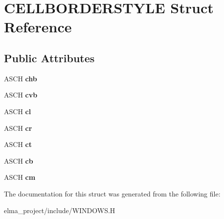\hypertarget{struct_c_e_l_l_b_o_r_d_e_r_s_t_y_l_e}{}\section{C\+E\+L\+L\+B\+O\+R\+D\+E\+R\+S\+T\+Y\+LE Struct Reference}
\label{struct_c_e_l_l_b_o_r_d_e_r_s_t_y_l_e}
\subsection*{Public Attributes}
\begin{DoxyCompactItemize}
\item 
\mbox{\label{struct_c_e_l_l_b_o_r_d_e_r_s_t_y_l_e_a98b86567db0bf3a2d7f94c09b8a48ca2}} 
A\+S\+CH {\bfseries chb}
\item 
\mbox{\label{struct_c_e_l_l_b_o_r_d_e_r_s_t_y_l_e_a7c53516716d782dbae97d0af6aece5bf}} 
A\+S\+CH {\bfseries cvb}
\item 
\mbox{\label{struct_c_e_l_l_b_o_r_d_e_r_s_t_y_l_e_adfe2563263d083749abad1df0557a051}} 
A\+S\+CH {\bfseries cl}
\item 
\mbox{\label{struct_c_e_l_l_b_o_r_d_e_r_s_t_y_l_e_ac44f0d6eaabbf5af11eb8f53a642cd77}} 
A\+S\+CH {\bfseries cr}
\item 
\mbox{\label{struct_c_e_l_l_b_o_r_d_e_r_s_t_y_l_e_a77623cef74d1115cb7fc2b7cdc5ff754}} 
A\+S\+CH {\bfseries ct}
\item 
\mbox{\label{struct_c_e_l_l_b_o_r_d_e_r_s_t_y_l_e_a147aa52a310fe3bf906e767d4427a066}} 
A\+S\+CH {\bfseries cb}
\item 
\mbox{\label{struct_c_e_l_l_b_o_r_d_e_r_s_t_y_l_e_ae5523ed86b8c251f9db29d3f867f723b}} 
A\+S\+CH {\bfseries cm}
\end{DoxyCompactItemize}


The documentation for this struct was generated from the following file\+:\begin{DoxyCompactItemize}
\item 
elma\+\_\+project/include/W\+I\+N\+D\+O\+W\+S.\+H\end{DoxyCompactItemize}
